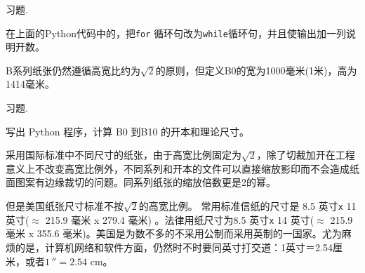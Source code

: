 \documentclass[main.tex]{subfiles}
\begin{document}
\begin{kaishu}习题.\end{kaishu} 在上面的Python代码中的，把\texttt{for} 循环句改为\texttt{while}循环句，并且使输出加一列说明开数。

B系列纸张仍然遵循高宽比约为$\sqrt{2}$的原则，但定义B0的宽为1000毫米(1米)，高为1414毫米。

\begin{kaishu}习题.\end{kaishu} 写出 Python 程序，计算 B0 到B10 的开本和理论尺寸。 

采用国际标准中不同尺寸的纸张，由于高宽比例固定为$\sqrt{2}$，除了切裁加开在工程意义上不改变高宽比例外，不同系列和开本的文件可以直接缩放影印而不会造成纸面图案有边缘裁切的问题。同系列纸张的缩放倍数更是2的幂。

但是美国纸张尺寸标准不按$\sqrt{2}$的高宽比例。 常用标准信纸的尺寸是 8.5 英寸\texttt{x}{ }11 英寸($\approx$ 215.9 毫米 x 279.4 毫米) 。法律用纸尺寸为8.5 英寸\texttt{x}{ }14 英寸($\approx$ 215.9 毫米 x 355.6 毫米)。美国是为数不多的不采用公制而采用英制的一国家。尤为麻烦的是，计算机网络和软件方面，仍然时不时要同英寸打交道：1英寸＝2.54厘米，或者$1\,'' = 2.54$ cm。
\newpage
\end{document}
